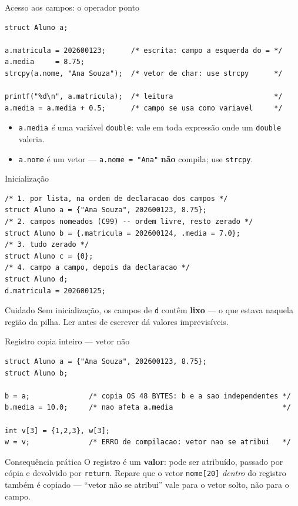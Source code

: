 \documentclass[aspectratio=169]{beamer}
\begin{document}
\begin{frame}[fragile]{Acesso aos campos: o operador ponto}
\begin{lstlisting}[basicstyle=\ttfamily\small]
struct Aluno a;

a.matricula = 202600123;      /* escrita: campo a esquerda do = */
a.media     = 8.75;
strcpy(a.nome, "Ana Souza");  /* vetor de char: use strcpy      */

printf("%d\n", a.matricula);  /* leitura                        */
a.media = a.media + 0.5;      /* campo se usa como variavel     */
\end{lstlisting}
  \begin{itemize}
    \item \texttt{a.media} \emph{é} uma variável \texttt{double}: vale em toda
      expressão onde um \texttt{double} valeria.
    \item \texttt{a.nome} é um vetor --- \texttt{a.nome = "Ana"} \textbf{não}
      compila; use \texttt{strcpy}.
  \end{itemize}
\end{frame}

\begin{frame}[fragile]{Inicialização}
\begin{lstlisting}[basicstyle=\ttfamily\scriptsize]
/* 1. por lista, na ordem de declaracao dos campos */
struct Aluno a = {"Ana Souza", 202600123, 8.75};
/* 2. campos nomeados (C99) -- ordem livre, resto zerado */
struct Aluno b = {.matricula = 202600124, .media = 7.0};
/* 3. tudo zerado */
struct Aluno c = {0};
/* 4. campo a campo, depois da declaracao */
struct Aluno d;
d.matricula = 202600125;
\end{lstlisting}
  \begin{alertblock}{Cuidado}
    Sem inicialização, os campos de \texttt{d} contêm \textbf{lixo} --- o que
    estava naquela região da pilha. Ler antes de escrever dá valores
    imprevisíveis.
  \end{alertblock}
\end{frame}

\begin{frame}[fragile]{Registro copia inteiro --- vetor não}
\begin{lstlisting}[basicstyle=\ttfamily\scriptsize]
struct Aluno a = {"Ana Souza", 202600123, 8.75};
struct Aluno b;

b = a;              /* copia OS 48 BYTES: b e a sao independentes */
b.media = 10.0;     /* nao afeta a.media                          */

int v[3] = {1,2,3}, w[3];
w = v;              /* ERRO de compilacao: vetor nao se atribui   */
\end{lstlisting}
  \begin{block}{Consequência prática}
    O registro é um \textbf{valor}: pode ser atribuído, passado por cópia e
    devolvido por \texttt{return}. Repare que o vetor \texttt{nome[20]}
    \emph{dentro} do registro também é copiado --- ``vetor não se atribui''
    vale para o vetor solto, não para o campo.
  \end{block}
\end{frame}
\end{document}

